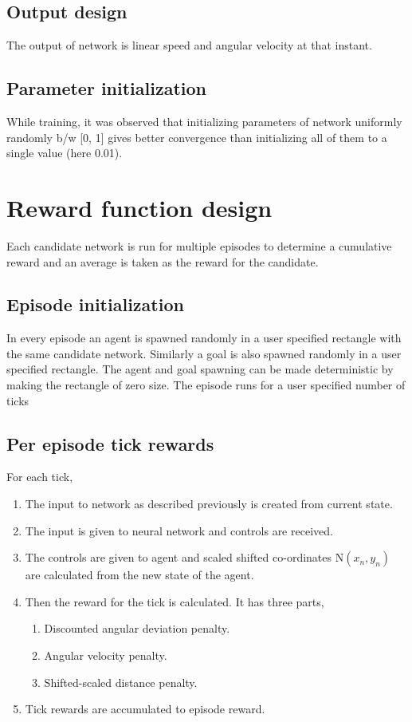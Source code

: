 \documentclass[12pt]{article}
\begin{document}
\subsection{Output design}
The output of network is linear speed and angular velocity at that instant.

\subsection{Parameter initialization}
While training, it was observed that initializing parameters of network uniformly randomly b/w [0, 1] gives better convergence than initializing all of them to a single value (here 0.01).

\section{Reward function design}
Each candidate network is run for multiple episodes to determine a cumulative reward and an average is taken as the reward for the candidate.

\subsection{Episode initialization}
In every episode an agent is spawned randomly in a user specified rectangle with the same candidate network.
Similarly a goal is also spawned randomly in a user specified rectangle.
The agent and goal spawning can be made deterministic by making the rectangle of zero size.
The episode runs for a user specified number of ticks

\subsection{Per episode tick rewards}
For each tick,
\begin{enumerate}[nolistsep]
    \item The input to network as described previously is created from current state.
    \item The input is given to neural network and controls are received.
    \item The controls are given to agent and scaled shifted co-ordinates N$(x_n, y_n)$ are calculated from the new state of the agent.
    \item Then the reward for the tick is calculated. It has three parts,
        \begin{enumerate}[nolistsep]
            \item Discounted angular deviation penalty.
            \item Angular velocity penalty.
            \item Shifted-scaled distance penalty.
        \end{enumerate}
    \item Tick rewards are accumulated to episode reward.
\end{enumerate}
\end{document}
